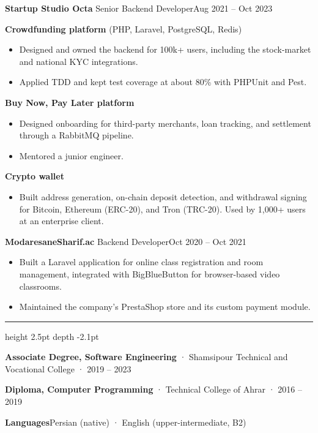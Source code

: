 \documentclass[10pt,a4paper]{article}
\newcommand{\datefont}{\sffamily}
\newlength{\railw}     \setlength{\railw}{21mm}
\newlength{\railsep}   \setlength{\railsep}{4mm}
\newcommand{\rail}[1]{\leavevmode\llap{\smash{\parbox[t]{\railw}{\raggedright #1}}\hspace{\railsep}}\ignorespaces}
\newcommand{\seclabel}[1]{\leavevmode{\ttfamily\fontsize{6.7}{8}\selectfont\color{accent}\MakeUppercase{#1}}}
\newcommand{\dates}[1]{{\datefont\fontsize{8.7}{10}\selectfont\color{soft}#1}}
\newif\ifaftersection
\newcommand{\cvsection}[1]{%
    \par\addvspace{9pt}%
    {\fontsize{6.5}{7.5}\selectfont\noindent\rail{\seclabel{#1}}%
     \textcolor{hair}{\leaders\hrule height 2.5pt depth -2.1pt\hfill}\kern0pt\par}%
    \nobreak\vspace{2pt}\global\aftersectiontrue
}
\newif\ifafterjob
\newcommand{\job}[3]{%
    \par\ifaftersection\global\aftersectionfalse\else\addvspace{6.5pt}\fi\noindent
    {\sffamily\bfseries\fontsize{10.4}{12.5}\selectfont #1}\hspace{0.7em}%
    {\sffamily\fontsize{9}{12.5}\selectfont\color{soft}#2}\hfill\dates{#3}\par\nobreak
    \global\afterjobtrue
}
\newcommand{\project}[1]{%
    \par\ifafterjob\global\afterjobfalse\addvspace{1.5pt}\else\addvspace{4.5pt}\fi\noindent
    {\sffamily\bfseries #1}\nobreak
}
\newcommand{\degree}[3]{{\sffamily\bfseries #1} · #2 · #3\par}
\begin{document}
\job{Startup Studio Octa}{Senior Backend Developer}{Aug 2021 – Oct 2023}

\project{Crowdfunding platform} {(PHP, Laravel, PostgreSQL, Redis)}

\begin{itemize}
    \item Designed and owned the backend  for 100k+ users, including
          the stock-market and national KYC integrations.

    \item Applied TDD and kept test coverage at about 80\% with PHPUnit and Pest.
\end{itemize}

\project{Buy Now, Pay Later platform}

\begin{itemize}
    \item Designed onboarding for third-party merchants, loan tracking, and settlement
          through a RabbitMQ pipeline.
    \item Mentored a junior engineer.
\end{itemize}

\project{Crypto wallet}

\begin{itemize}
    \item Built address generation, on-chain deposit detection, and withdrawal signing
          for Bitcoin, Ethereum (ERC-20), and Tron (TRC-20). Used by 1,000+ users at an
          enterprise client.
\end{itemize}

\job{ModaresaneSharif.ac}{Backend Developer}{Oct 2020 – Oct 2021}

\begin{itemize}
    \item Built a Laravel application for online class registration and room management,
          integrated with BigBlueButton for browser-based video classrooms.

    \item Maintained the company's PrestaShop store and its custom payment module.
\end{itemize}

\cvsection{Education}

\degree{Associate Degree, Software Engineering}{Shamsipour Technical and Vocational College}{2019 – 2023}
\degree{Diploma, Computer Programming}{Technical College of Ahrar}{2016 – 2019}
\vspace{2.5pt}
{\sffamily\bfseries Languages}\hspace{0.6em}Persian (native) · English (upper-intermediate, B2)\par
\end{document}
